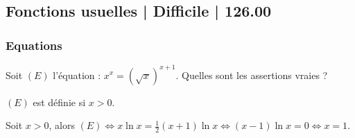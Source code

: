 \subsection{Fonctions usuelles | Difficile | 126.00}

\subsubsection{Equations}

\begin{question} 

Soit $(E)$ l'équation : $ x^x=(\sqrt x)^{x+1}$.  Quelles sont les assertions vraies ?

\begin{answers}

     \good{Le domaine de définition de $(E)$ est $]0,+\infty[$.}
     


\end{answers}
\begin{explanations}
$(E)$ est définie si $x>0$. 

Soit $x>0$, alors $(E) \Leftrightarrow x \ln x  = \frac{1}{2}(x+1)\ln x  \Leftrightarrow (x-1) \ln x = 0 \Leftrightarrow x=1.$
\end{explanations}


\end{question}




